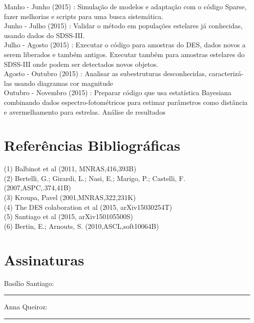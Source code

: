 \documentclass{article}
\begin{document}
Manho - Junho (2015) : Simulação de modelos e adaptação com o código Sparse, fazer melhorias e scripts para uma busca sistemática.\\
Junho - Julho (2015) : Validar o método em populações estelares já conhecidas, usando dados do SDSS-III. \\
Julho - Agosto (2015) : Executar o código para amostras do DES, dados novos a serem liberados e também antigos. Executar também para amostras estelares do SDSS-III onde podem ser detectados novos objetos.\\
Agosto - Outubro (2015) : Analisar as subestruturas desconhecidas, caracterizá-las usando diagramas cor magnitude \\
Outubro - Novembro (2015) : Preparar código que usa estatística Bayesiana combinando dados espectro-fotométricos para estimar parâmetros como distância e avermelhamento para estrelas. Análise de resultados

\section{Referências Bibliográficas}
(1) Balbinot et al (2011, MNRAS,416,393B) \\
(2) Bertelli, G.; Girardi, L.; Nasi, E.; Marigo, P.; Castelli, F. (2007,ASPC,.374,41B) \\
(3) Kroupa, Pavel (2001,MNRAS,322,231K) \\
(4) The DES colaboration et al (2015, arXiv15030254T) \\
(5) Santiago et al (2015, arXiv150105500S) \\
(6) Bertin, E.; Arnouts, S. (2010,ASCL,soft10064B) \\
    
\section{Assinaturas}

Basílio Santiago:\rule{5cm}{.1mm}  Anna Queiroz:\rule{5cm}{.1mm} 
\end{document}
